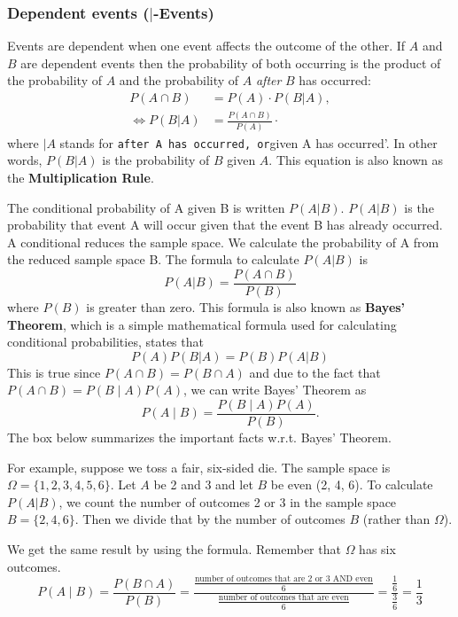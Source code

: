 \documentclass[
  12pt,
  oneside]{book}
\theoremstyle{definition}
\theoremstyle{definition}
\theoremstyle{definition}
\theoremstyle{definition}
\theoremstyle{remark}
\begin{document}
\hypertarget{dependent-events--events}{%
\subsubsection{\texorpdfstring{Dependent events (\(|\)-Events)}{Dependent events (\textbar-Events)}}\label{dependent-events--events}}

Events are dependent when one event affects the outcome of the other. If \(A\) and \(B\) are dependent events then the probability of both occurring is the product of the probability of \(A\) and the probability of \(A\) \emph{after} \(B\) has occurred:
\begin{align*}
    P(A \cap B)&=P(A)\cdot P(B|A),\\
    \Leftrightarrow P(B|A)&=\frac{P(A \cap B)}{P(A)}\cdot 
\end{align*}
where \(|A\) stands for \texttt{after\ A\ has\ occurred\textquotesingle{},\ or}given A has occurred'. In other words, \(P(B|A)\) is the probability of \(B\) given \(A\). This equation is also known as the \textbf{Multiplication Rule}.

The conditional probability of A given B is written \(P(A|B)\). \(P(A|B)\) is the probability that event A will occur given that the event B has already occurred. A conditional reduces the sample space. We calculate the probability of A from the reduced sample space B. The formula to calculate \(P(A|B)\) is \[ P(A|B) = \frac{P\left(A\cap B\right)}{P\left(B\right)}\] where \(P(B)\) is greater than zero.
This formula is also known as \textbf{Bayes' Theorem}, which is a simple mathematical formula used for calculating conditional probabilities, states that
\[
P(A)P(B|A)=P(B)P(A|B)
\]
This is true since \(P(A \cap B)=P(B \cap A)\) and due to the fact that \(P(A\cap B)=P(B\mid A)P(A)\), we can write Bayes' Theorem as
\[P(A\mid B)={\frac {P(B\mid A)P(A)}{P(B)}}.\]
The box below summarizes the important facts w.r.t. Bayes' Theorem.

For example, suppose we toss a fair, six-sided die. The sample space is
\(\Omega = \{1, 2, 3, 4, 5, 6\}\). Let \(A\) be 2 and 3 and let \(B\) be even (2, 4, 6). To calculate \(P(A|B)\), we count the number of outcomes 2 or 3 in the sample space \(B = \{2, 4, 6\}\). Then we divide that by the number of outcomes \(B\) (rather than \(\Omega\)).

We get the same result by using the formula. Remember that \(\Omega\) has six outcomes.
\[P(A\mid B)=\frac{P(B\cap A)}{P(B)} = \frac{\frac{\text{number of outcomes that are 2 or 3 AND even}}{6}}{\frac{\text{number of outcomes that are even}}{6}}=\frac{\frac{1}{6}}{\frac{3}{6}}=\frac{1}{3} \]
\end{document}
